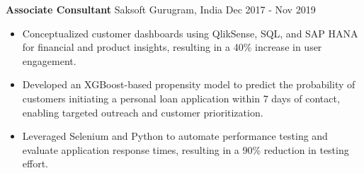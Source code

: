 \documentclass[10pt,a4paper]{article}
\newcommand{\role}[4]{\textbf{#1} \textbar{} #2 \hfill #3 \textbar{} #4\par}
\begin{document}
\vspace{3pt}
\role{Associate Consultant}{Saksoft}{Gurugram, India}{Dec 2017 - Nov 2019}
\begin{itemize}
  \item Conceptualized customer dashboards using QlikSense, SQL, and SAP HANA for financial and product insights, resulting in a 40\% increase in user engagement.
  \item Developed an XGBoost-based propensity model to predict the probability of customers initiating a personal loan application within 7 days of contact, enabling targeted outreach and customer prioritization.
  \item Leveraged Selenium and Python to automate performance testing and evaluate application response times, resulting in a 90\% reduction in testing effort.
\end{itemize}
\end{document}
